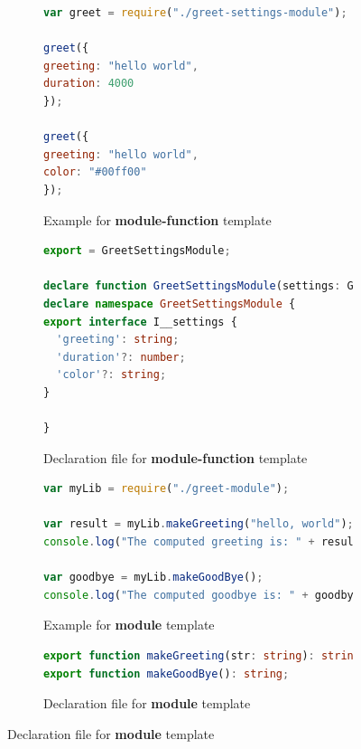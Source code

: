 \documentclass[sigplan,screen]{acmart}
\begin{document}
\begin{figure}[t]
\centering
\begin{subfigure}[t]{0.48\linewidth}
  \begin{lstlisting}[language=JavaScript,numbers=none]
var greet = require("./greet-settings-module");

greet({
greeting: "hello world",
duration: 4000
});

greet({
greeting: "hello world",
color: "#00ff00"
});
  \end{lstlisting}
  \caption{Example for \textbf{module-function} template}
  \label{fig:example-module-function}
\end{subfigure}
\hfill
\begin{subfigure}[t]{0.48\linewidth}
  \begin{lstlisting}[language=TypeScript,numbers=none]
export = GreetSettingsModule;

declare function GreetSettingsModule(settings: GreetSettingsModule.I__settings): void;
declare namespace GreetSettingsModule {
export interface I__settings {
  'greeting': string;
  'duration'?: number;
  'color'?: string;
}

}
  \end{lstlisting}
  \caption{Declaration file for \textbf{module-function} template}
  \label{fig:template-module-function}
\end{subfigure}

\begin{subfigure}[t]{0.48\linewidth}
    \begin{lstlisting}[language=JavaScript,numbers=none]
var myLib = require("./greet-module");

var result = myLib.makeGreeting("hello, world");
console.log("The computed greeting is: " + result);

var goodbye = myLib.makeGoodBye();
console.log("The computed goodbye is: " + goodbye);    
    \end{lstlisting}
  \caption{Example for \textbf{module} template}
  \label{fig:example-module}
  \end{subfigure}
  \hfill
  \begin{subfigure}[t]{0.48\linewidth}
    \begin{lstlisting}[language=TypeScript,numbers=none]
export function makeGreeting(str: string): string;
export function makeGoodBye(): string;        
    \end{lstlisting}
    \caption{Declaration file for \textbf{module} template}
    \label{fig:template-module}
  \end{subfigure}


\end{figure}
\end{document}
